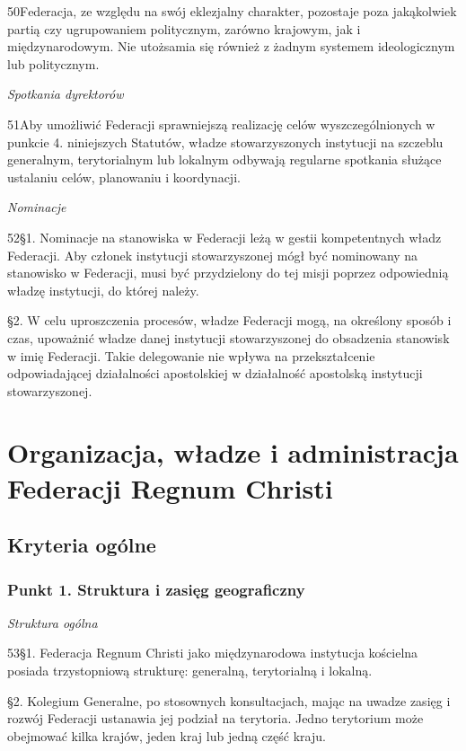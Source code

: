 ﻿\documentclass{book}
\newcommand{\lett}[1]{\lettrine[findent=6pt]{#1}}
\newcommand{\ssec}[1]{\vspace{1em}\textit{#1}\vspace{.5em}\nopagebreak}
\begin{document}
\lett{50} Federacja, ze względu na swój eklezjalny charakter, pozostaje poza jakąkolwiek partią czy ugrupowaniem politycznym, zarówno krajowym, jak i międzynarodowym. Nie utożsamia się również z żadnym systemem ideologicznym lub politycznym.
 
\ssec{Spotkania dyrektorów}
 
\lett{51} Aby umożliwić Federacji sprawniejszą realizację celów wyszczególnionych w punkcie 4. niniejszych Statutów, władze stowarzyszonych instytucji na szczeblu generalnym, terytorialnym lub lokalnym odbywają regularne spotkania służące ustalaniu celów, planowaniu i koordynacji.
 
\ssec{Nominacje}
 
\lett{52} \S{}1. Nominacje na stanowiska w Federacji leżą w gestii kompetentnych władz Federacji. Aby członek instytucji stowarzyszonej mógł być nominowany na stanowisko w Federacji, musi być przydzielony do tej misji poprzez odpowiednią władzę instytucji, do której należy.


\S{}2. W celu uproszczenia procesów, władze Federacji mogą, na określony sposób i czas, upoważnić władze danej instytucji stowarzyszonej do obsadzenia stanowisk w imię Federacji. Takie delegowanie nie wpływa na przekształcenie odpowiadającej działalności apostolskiej w działalność apostolską instytucji stowarzyszonej.
 


 \part{Organizacja, władze i administracja\\Federacji Regnum Christi}


 \chapter{Kryteria ogólne}


\section{Punkt 1. Struktura i zasięg geograficzny}


\ssec{Struktura ogólna}
 
\lett{53} \S{}1. Federacja Regnum Christi jako międzynarodowa instytucja kościelna posiada trzystopniową strukturę: generalną, terytorialną i lokalną.


\S{}2. Kolegium Generalne, po stosownych konsultacjach, mając na uwadze zasięg i rozwój Federacji ustanawia jej podział na terytoria. Jedno terytorium może obejmować kilka krajów, jeden kraj lub jedną część kraju.
 
\end{document}
